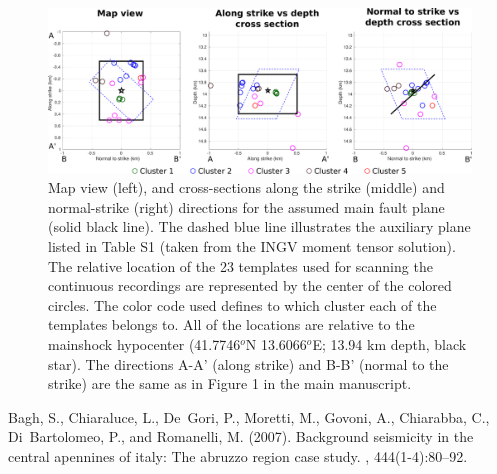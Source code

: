 \documentclass[a4paper,12pt]{article}
\begin{document}
\begin{figure}[!h]
\renewcommand{\thefigure}{S\arabic{figure}}
\begin{center}
 \includegraphics[width=1\linewidth]{S6_templates_per_cluster_map.pdf} 
\end{center}
\caption{Map view (left), and cross-sections along the strike (middle) and normal-strike (right) directions for the assumed main fault plane (solid black line). The dashed blue line illustrates the auxiliary plane listed in Table S1 (taken from the INGV moment tensor solution). The relative location of the 23 templates used for scanning the continuous recordings are represented by the center of the colored circles. The color code used defines to which cluster each of the templates belongs to. All of the locations are relative to the mainshock hypocenter (41.7746$^o$N 13.6066$^o$E; 13.94 km depth, black star). The directions A-A' (along strike) and B-B' (normal to the strike) are the same as in Figure 1 in the main manuscript.}
\label{fig:S6_templates_map}
\end{figure}




\FloatBarrier

\begin{thebibliography}{}

Bagh, S., Chiaraluce, L., De~Gori, P., Moretti, M., Govoni, A., Chiarabba, C.,
  Di~Bartolomeo, P., and Romanelli, M. (2007).
\newblock Background seismicity in the central apennines of italy: The abruzzo
  region case study.
, 444(1-4):80--92.

\end{thebibliography}{}
\end{document}

